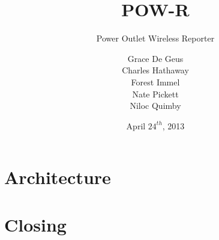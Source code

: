 \documentclass[compress]{beamer}
\title{POW-R}
\subtitle{Power Outlet Wireless Reporter}
\author[]{Grace De Geus\\Charles Hathaway\\Forest Immel\\Nate Pickett\\Niloc Quimby}
\date{April $24^{th}$, 2013}
\begin{document}
\frame{
    \titlepage
}


\section{Architecture}







\section{Closing}
%

\end{document}

